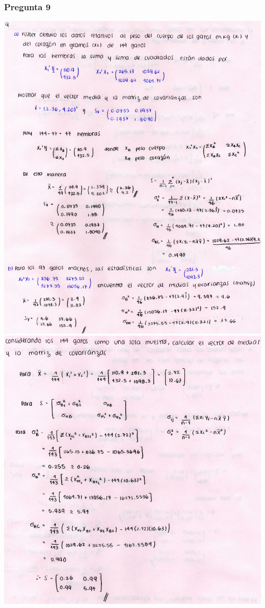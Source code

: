 \documentclass[
]{article}
\begin{document}
\hypertarget{pregunta-9}{%
\subsubsection{\texorpdfstring{\textbf{Pregunta
9}}{Pregunta 9}}\label{pregunta-9}}

\includegraphics{9a.jpg} \includegraphics{9b.jpg}
\end{document}
